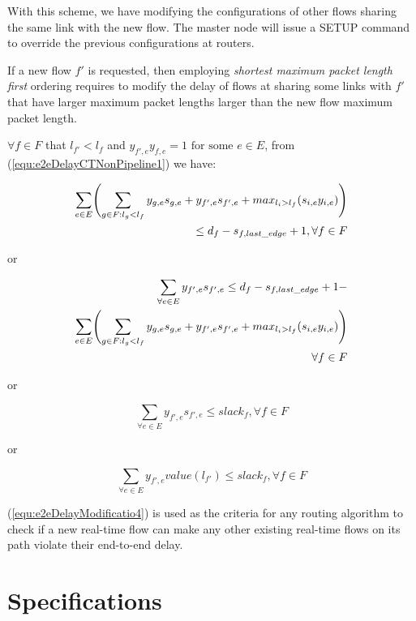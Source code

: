 \documentclass[conference, twocolumn]{IEEEtran}
\theoremstyle{definition}
\begin{document}
With this scheme, we have modifying the configurations of other flows sharing
the same link with the new flow. The master node will issue a SETUP command to
override the previous configurations at routers.

If a new flow $f'$ is requested, then employing {\em shortest maximum packet
length first} ordering requires to modify the delay of flows at sharing some
links with $f'$ that have larger maximum packet lengths larger than the new flow
maximum packet length. 

$\forall f \in F$  that $l_{f'} < l_f$ and $y_{f',e}y_{f,e}=1 \mbox{ for some }
e \in E$, from (\ref{equ:e2eDelayCTNonPipeline1}) we have:

\begin{eqnarray}\label{equ:e2eDelayModification}
\sum_{e \in E} \Biggl(\sum_{g \in F:l_g <
l_f}y_{g,e}s_{g,e}+y_{f',e}s_{f',e}+max_{l_i>l_f}(s_{i,e}y_{i,e})\Biggr)\notag
\\ \leq d_f-s_{f, last\_edge} + 1, \forall f \in F
\end{eqnarray}

or

\begin{eqnarray}\label{equ:e2eDelayModificatio2}
\sum_{\forall e \in E}y_{f',e}s_{f',e} \leq d_f-s_{f,last\_edge} + 1 - \notag \\ 
\sum_{e \in E} \Biggl(\sum_{g \in F:l_g <
l_f}y_{g,e}s_{g,e}+y_{f',e}s_{f',e}+max_{l_i>l_f}(s_{i,e}y_{i,e})\Biggr) \notag
\\ \forall f \in F
\end{eqnarray}

or

\begin{equation}\label{equ:e2eDelayModificatio3}
\sum_{\forall e \in E}y_{f',e}s_{f',e} \leq slack_f, \forall f \in F
\end{equation}

or

\begin{equation}\label{equ:e2eDelayModificatio4}
\sum_{\forall e \in E}y_{f',e}value(l_{f'}) \leq slack_f, \forall f \in F
\end{equation}

(\ref{equ:e2eDelayModificatio4}) is used as the criteria for any routing
algorithm to check if a new real-time flow can make any other existing
real-time flows on its path violate their end-to-end delay.

\section{Specifications}
\end{document}

